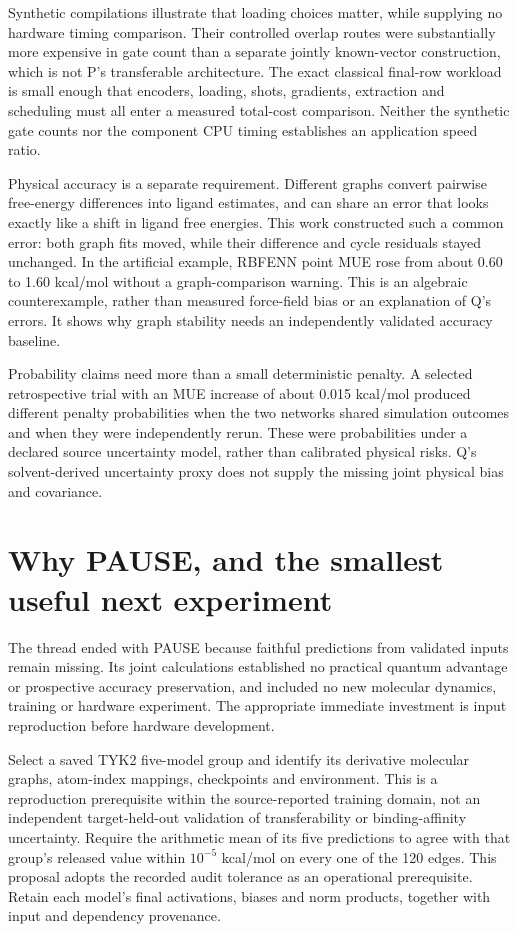 \documentclass{article}
\begin{document}
Synthetic compilations illustrate that loading choices matter, while supplying no hardware timing comparison. Their controlled overlap routes were substantially more expensive in gate count than a separate jointly known-vector construction, which is not P's transferable architecture. The exact classical final-row workload is small enough that encoders, loading, shots, gradients, extraction and scheduling must all enter a measured total-cost comparison. Neither the synthetic gate counts nor the component CPU timing establishes an application speed ratio.

Physical accuracy is a separate requirement. Different graphs convert pairwise free-energy differences into ligand estimates, and can share an error that looks exactly like a shift in ligand free energies. This work constructed such a common error: both graph fits moved, while their difference and cycle residuals stayed unchanged. In the artificial example, RBFENN point MUE rose from about 0.60 to 1.60 kcal/mol without a graph-comparison warning. This is an algebraic counterexample, rather than measured force-field bias or an explanation of Q's errors. It shows why graph stability needs an independently validated accuracy baseline.

Probability claims need more than a small deterministic penalty. A selected retrospective trial with an MUE increase of about 0.015 kcal/mol produced different penalty probabilities when the two networks shared simulation outcomes and when they were independently rerun. These were probabilities under a declared source uncertainty model, rather than calibrated physical risks. Q's solvent-derived uncertainty proxy does not supply the missing joint physical bias and covariance.

\section{Why PAUSE, and the smallest useful next experiment}

The thread ended with PAUSE because faithful predictions from validated inputs remain missing. Its joint calculations established no practical quantum advantage or prospective accuracy preservation, and included no new molecular dynamics, training or hardware experiment. The appropriate immediate investment is input reproduction before hardware development.

Select a saved TYK2 five-model group and identify its derivative molecular graphs, atom-index mappings, checkpoints and environment. This is a reproduction prerequisite within the source-reported training domain, not an independent target-held-out validation of transferability or binding-affinity uncertainty. Require the arithmetic mean of its five predictions to agree with that group's released value within \(10^{-5}\) kcal/mol on every one of the 120 edges. This proposal adopts the recorded audit tolerance as an operational prerequisite. Retain each model's final activations, biases and norm products, together with input and dependency provenance.
\end{document}
